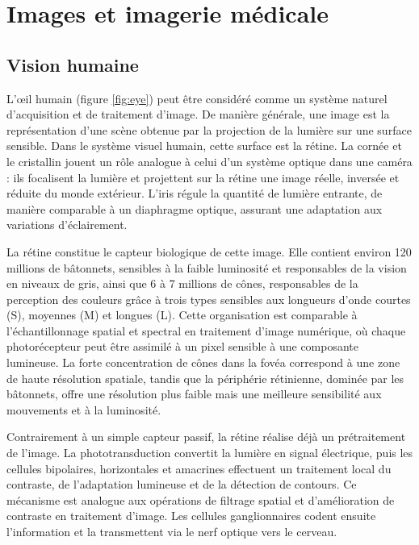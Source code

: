 \section{Images et imagerie médicale}

\subsection{Vision humaine}
L'œil humain (figure \ref{fig:eye}) peut être considéré comme un système naturel d'acquisition et de traitement d'image. De manière générale, une image est la représentation d'une scène obtenue par la projection de la lumière sur une surface sensible. Dans le système visuel humain, cette surface est la rétine. La cornée et le cristallin jouent un rôle analogue à celui d'un système optique dans une caméra : ils focalisent la lumière et projettent sur la rétine une image réelle, inversée et réduite du monde extérieur. L'iris régule la quantité de lumière entrante, de manière comparable à un diaphragme optique, assurant une adaptation aux variations d'éclairement.

La rétine constitue le capteur biologique de cette image. Elle contient environ 120 millions de bâtonnets, sensibles à la faible luminosité et responsables de la vision en niveaux de gris, ainsi que 6 à 7 millions de cônes, responsables de la perception des couleurs grâce à trois types sensibles aux longueurs d'onde courtes (S), moyennes (M) et longues (L). Cette organisation est comparable à l'échantillonnage spatial et spectral en traitement d'image numérique, où chaque photorécepteur peut être assimilé à un pixel sensible à une composante lumineuse. La forte concentration de cônes dans la fovéa correspond à une zone de haute résolution spatiale, tandis que la périphérie rétinienne, dominée par les bâtonnets, offre une résolution plus faible mais une meilleure sensibilité aux mouvements et à la luminosité.

Contrairement à un simple capteur passif, la rétine réalise déjà un prétraitement de l'image. La phototransduction convertit la lumière en signal électrique, puis les cellules bipolaires, horizontales et amacrines effectuent un traitement local du contraste, de l'adaptation lumineuse et de la détection de contours. Ce mécanisme est analogue aux opérations de filtrage spatial et d'amélioration de contraste en traitement d'image. Les cellules ganglionnaires codent ensuite l'information et la transmettent via le nerf optique vers le cerveau.

